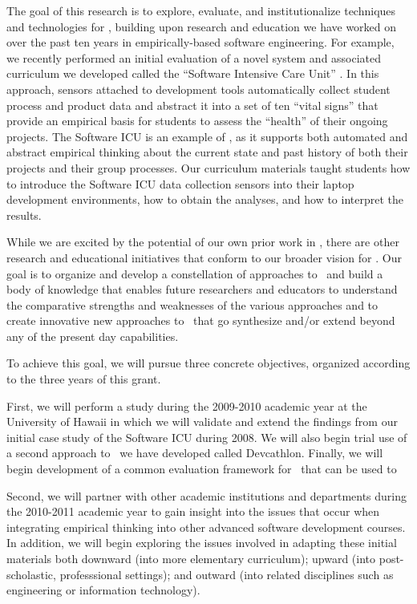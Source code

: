 The goal of this research is to explore, evaluate, and institutionalize
techniques and technologies for \eCT, building upon research and education
we have worked on over the past ten years in empirically-based software
engineering.  For example, we recently performed an initial evaluation of a
novel system and associated curriculum we developed called the ``Software
Intensive Care Unit'' \citep{csdl2-09-02}.  In this approach, sensors
attached to development tools automatically collect student process and
product data and abstract it into a set of ten ``vital signs'' that provide
an empirical basis for students to assess the ``health'' of their ongoing
projects.  The Software ICU is an example of \eCT, as it supports both
automated and abstract empirical thinking about the current state and past
history of both their projects and their group processes.  Our curriculum
materials taught students how to introduce the Software ICU data collection
sensors into their laptop development environments, how to obtain the
analyses, and how to interpret the results.

While we are excited by the potential of our own prior work in \eCT, there
are other research and educational initiatives that conform to our broader
vision for \eCT.  Our goal is to organize and develop a constellation of
approaches to \eCT\ and build a body of knowledge that enables future
researchers and educators to understand the comparative strengths and
weaknesses of the various approaches and to create innovative new
approaches to \eCT\ that go synthesize and/or extend beyond any of the
present day capabilities.

To achieve this goal, we will pursue three concrete objectives, organized
according to the three years of this grant.  

First, we will perform a study during the 2009-2010 academic year at the
University of Hawaii in which we will validate and extend the findings from
our initial case study of the Software ICU during 2008.  We will also begin
trial use of a second approach to \eCT\ we have developed called Devcathlon. 
Finally, we will begin development of a common evaluation framework for \eCT\ that
can be used to 

Second, we will partner with other academic institutions and departments
during the 2010-2011 academic year to gain insight into the issues that
occur when integrating empirical thinking into other advanced software
development courses.  In addition, we will begin exploring the issues
involved in adapting these initial materials both downward (into more
elementary curriculum); upward (into post-scholastic, professsional
settings); and outward (into related disciplines such as engineering or
information technology).

